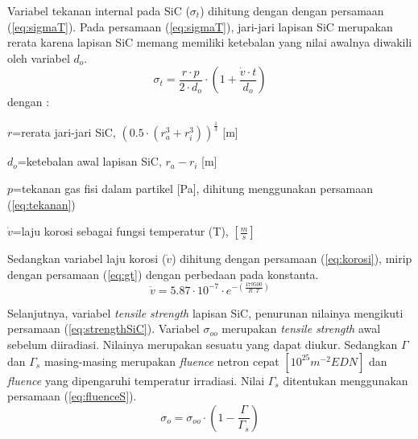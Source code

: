 \documentclass[a4paper,11pt]{report}
\begin{document}
Variabel tekanan internal pada SiC ($\sigma_t$) dihitung dengan dengan persamaan (\ref{eq:sigmaT}). Pada persamaan (\ref{eq:sigmaT}), jari-jari lapisan SiC merupakan rerata karena lapisan SiC memang memiliki ketebalan yang nilai awalnya diwakili oleh variabel $d_o$.
\begin{equation}
  \sigma_t =\frac{r \cdot p}{2 \cdot d_o} \cdot \left( 1+\frac{\dot{v} \cdot t}{d_o} \right)
  \label{eq:sigmaT}
\end{equation}
dengan :
\begin{description}
  \item $r$=rerata jari-jari SiC, $\left( 0.5 \cdot \left( r_a^3 + r_i^3 \right)\right)^{\frac{1}{3}}$ [m]
  \item $d_o$=ketebalan awal lapisan SiC, $r_a - r_i$ [m]
  \item $p$=tekanan gas fisi dalam partikel [Pa], dihitung menggunakan persamaan (\ref{eq:tekanan})
  \item $\dot{v}$=laju korosi sebagai fungsi temperatur (T), $\left[\frac{m}{s}\right]$
\end{description}

Sedangkan variabel laju korosi ($\dot{v}$) dihitung dengan persamaan (\ref{eq:korosi}), mirip dengan persamaan (\ref{eq:gt}) dengan perbedaan pada konstanta.
\begin{equation}
  \dot{v}=5.87 \cdot 10^{-7} \cdot e^{-\left( \frac{179500}{R \cdot T}\right)}
  \label{eq:korosi}
\end{equation}

Selanjutnya, variabel \textit{tensile strength} lapisan SiC, penurunan nilainya mengikuti persamaan (\ref{eq:strengthSiC}). Variabel $\sigma_{oo}$ merupakan \textit{tensile strength} awal sebelum diiradiasi. Nilainya merupakan sesuatu yang dapat diukur. Sedangkan $\Gamma$ dan $\Gamma_s$ masing-masing merupakan \textit{fluence} netron cepat $\left[ 10^{25}m^{-2} EDN\right]$ dan \textit{fluence} yang dipengaruhi temperatur irradiasi. Nilai $\Gamma_s$ ditentukan menggunakan persamaan (\ref{eq:fluenceS}). %
\begin{equation}
  \sigma_o = \sigma_{oo} \cdot \left( 1- \frac{\Gamma}{\Gamma_s} \right)
  \label{eq:strengthSiC}
\end{equation}
\end{document}
